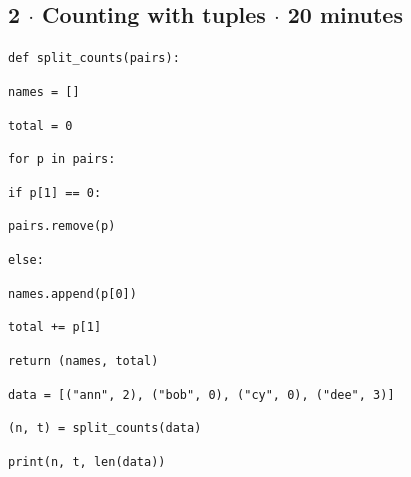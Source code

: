 \documentclass[11pt]{article}
\begin{document}
\begin{keepsection}
\begin{keepsection}
\end{keepsection}

\begin{keepsection}
\subsection{2 \ensuremath{\cdot} Counting with tuples \ensuremath{\cdot} 20 minutes}
\begin{tcolorbox}[colback=Paperblue,colframe=Paperblue,boxrule=0pt,arc=0pt,left=7pt,right=7pt,top=5pt,bottom=5pt]\small\sloppy
\noindent\hspace*{0em}\texttt{def split\_counts(pairs):}\par
\noindent\hspace*{1em}\texttt{names = []}\par
\noindent\hspace*{1em}\texttt{total = 0}\par
\noindent\hspace*{1em}\texttt{for p in pairs:}\par
\noindent\hspace*{3em}\texttt{if p[1] == 0:}\par
\noindent\hspace*{5em}\texttt{pairs.remove(p)}\par
\noindent\hspace*{3em}\texttt{else:}\par
\noindent\hspace*{5em}\texttt{names.append(p[0])}\par
\noindent\hspace*{5em}\texttt{total += p[1]}\par
\noindent\hspace*{1em}\texttt{return (names, total)}\par
\noindent\hspace*{0em}\texttt{}\par
\noindent\hspace*{0em}\texttt{data = [("ann", 2), ("bob", 0), ("cy", 0), ("dee", 3)]}\par
\noindent\hspace*{0em}\texttt{(n, t) = split\_counts(data)}\par
\noindent\hspace*{0em}\texttt{print(n, t, len(data))}\par
\end{tcolorbox}


\end{keepsection}
\end{keepsection}
\end{document}
